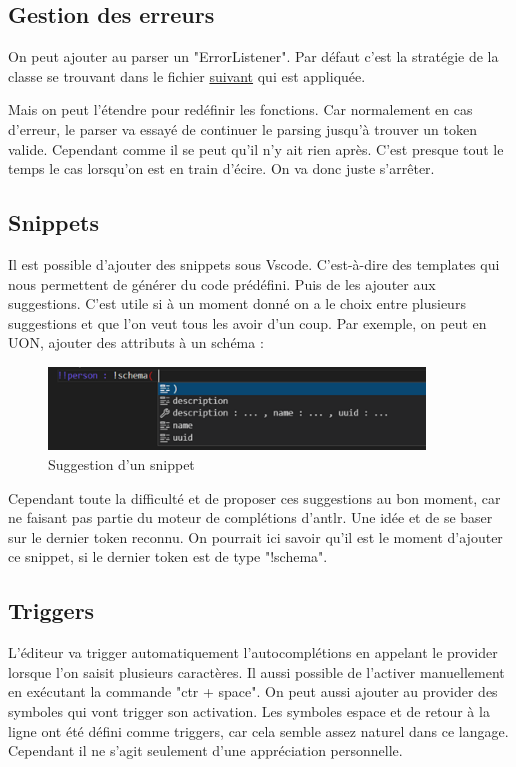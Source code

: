 \documentclass[
    iict, %
    il, %
]{heig-tb}
\begin{document}
\subsection{Gestion des erreurs}\label{error handle}
On peut ajouter au parser un "ErrorListener".
Par défaut c'est la stratégie de la classe se trouvant dans le fichier \href{https://github.com/tunnelvisionlabs/antlr4ts/blob/master/src/DefaultErrorStrategy.ts}{suivant} qui est appliquée.

Mais on peut l'étendre pour redéfinir les fonctions.
Car normalement en cas d'erreur, le parser va essayé de continuer le parsing jusqu'à trouver un token valide.
Cependant comme il se peut qu'il n'y ait rien après. C'est presque tout le temps le cas lorsqu'on est en train d'écire.
On va donc juste s'arrêter.

\subsection{Snippets}
Il est possible d'ajouter des snippets sous Vscode. C'est-à-dire des templates qui nous permettent de générer du code prédéfini. Puis de les ajouter aux suggestions.
C'est utile si à un moment donné on a le choix entre plusieurs suggestions et que l'on veut tous les avoir d'un coup.
Par exemple, on peut en UON, ajouter des attributs à un schéma :

\begin{figure}[!ht]
    \begin{center}
        \includegraphics[width=10cm]{assets/figures/snippet-suggestion.png}
    \end{center}
    \caption[Suggestion d'un snippet]{\label{snippet-suggestion} Suggestion d'un snippet}
\end{figure}

Cependant toute la difficulté et de proposer ces suggestions au bon moment, car ne faisant pas partie du moteur de complétions d'antlr. Une idée et de se baser sur le dernier token reconnu. On pourrait ici savoir qu'il est le moment d'ajouter ce snippet, si le dernier token est de type "!schema".

\subsection{Triggers}
L'éditeur va trigger automatiquement l'autocomplétions en appelant le provider lorsque l'on saisit plusieurs caractères. Il aussi possible de l'activer manuellement en exécutant la commande "ctr + space".
On peut aussi ajouter au provider des symboles qui vont trigger son activation. Les symboles espace et de retour à la ligne ont été défini comme triggers, car cela semble assez naturel dans ce langage. Cependant il ne s'agit seulement d'une appréciation personnelle.
\end{document}
